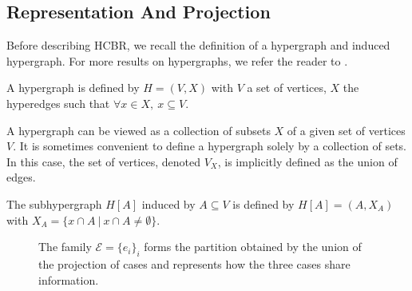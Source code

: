 \documentclass[sigconf,edbt]{acmart-edbt-workshops}
\def\HCBR{{\sc HCBR}}
\begin{document}
\subsection{Representation And Projection}
\label{sec:rep}

Before describing \HCBR, we recall the definition of a hypergraph and induced hypergraph. For more results on hypergraphs, we refer the reader to \cite{berge1984hypergraphs}.
\begin{definition}[Hypergraph]
A hypergraph is defined by $H = (V, X)$ with $V$ a set of vertices, $X$ the hyperedges such that $\forall x \in X, ~ x \subseteq V$.
\end{definition}
\noindent
A hypergraph can be viewed as a collection of subsets $X$ of a given set of vertices $V$. It is sometimes convenient to define a hypergraph solely by a collection of sets. In this case, the set of vertices, denoted $V_X$, is implicitly defined as the union of edges.

\begin{definition}
The subhypergraph $H[A]$ induced by $A \subseteq V$ is defined by $H[A] = (A, X_A)$ with $X_A = \{ x \cap A ~ | ~ x \cap A \neq \emptyset\}$.
\end{definition}
\begin{figure}[!h]
  \centering
  \def\firstcircle{(0,0) ellipse (1.5cm and 1cm)}
  \def\secondcircle{(80:-1cm) ellipse (1.5cm and 1cm)}
  \def\thirdcircle{(0:2cm) ellipse (1.5cm and 1cm)}
  \caption{\label{case_base} The family $\mathcal E = \{ e_i \}_{i}$ forms the partition obtained by the union of the projection of cases and represents how the three cases share information.}
\end{figure}
\end{document}
